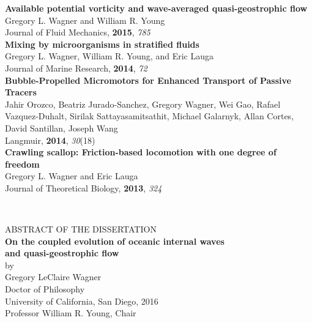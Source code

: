 \documentclass[12pt, oneside]{book}
\begin{document}
\noindent \textbf{Available potential vorticity and wave-averaged quasi-geostrophic flow} \\
Gregory L. Wagner and William R. Young \\
Journal of Fluid Mechanics, {\bf 2015}, {\it 785} \\

\noindent \textbf{Mixing by microorganisms in stratified fluids} \\ 
Gregory L. Wagner, William R. Young, and Eric Lauga \\
Journal of Marine Research, {\bf 2014}, {\it 72} \\  

\noindent \textbf{Bubble-Propelled Micromotors for Enhanced Transport of Passive Tracers} \\
Jahir Orozco, Beatriz Jurado-Sanchez, Gregory Wagner, Wei Gao, Rafael Vazquez-Duhalt, 
Sirilak Sattayasamitsathit, Michael Galarnyk, Allan Cortes, David Santillan, Joseph Wang \\
Langmuir, {\bf 2014}, {\it 30}(18) \\

\noindent \textbf{Crawling scallop: Friction-based locomotion with one degree of freedom} \\
Gregory L. Wagner and Eric Lauga \\
Journal of Theoretical Biology, {\bf 2013}, {\it 324} \\

\clearpage {} {}
\label{abstractChapter}

\begingroup  
  \centering  
  
 \mbox{ } \vspace{1.5in}
  
  ABSTRACT OF THE DISSERTATION \\[6ex]
  \textbf{On the coupled evolution of oceanic internal waves \\ and quasi-geostrophic flow} \\[6ex]
  by \\[5ex]
  \doublespacing 
  Gregory LeClaire Wagner \\ 
  Doctor of Philosophy \\
  University of California, San Diego, 2016 \\[4ex]
  Professor William R. Young, Chair \\[4ex]
  
\end{document}
